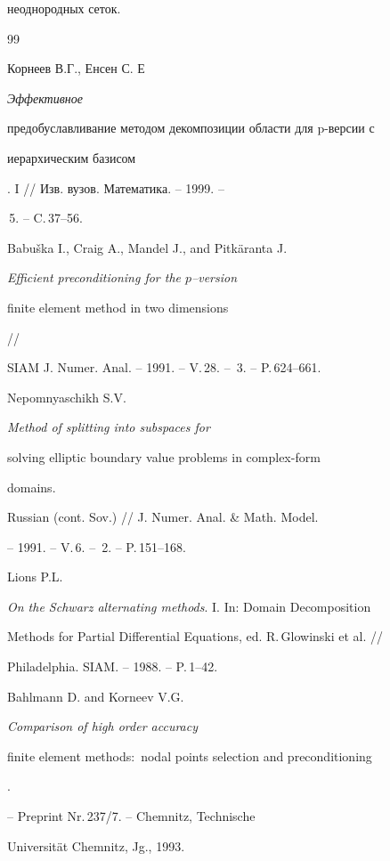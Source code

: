неоднородных сеток. 





\begin{thebibliography}{99} 







Корнеев В.Г., Енсен С. Е {\em Эффективное 


предобуславливание методом декомпозиции области для p-версии с 


иерархическим базисом}. I // Изв. вузов. Математика. -- 1999. --


\No\,5. -- C.\,37--56.




Babu\v{s}ka I., Craig A., Mandel J., and  Pitk\"{a}ranta J.


{\em Efficient preconditioning for the $p$--version 


finite element method in two dimensions} //


SIAM J. Numer. Anal. -- 1991. -- V.\,28. -- \No\,3. -- P.\,624--661.




Nepomnyaschikh S.V. {\em Method of splitting into subspaces for


solving elliptic boundary value problems in complex-form


domains.}


Russian (cont. Sov.) // J. Numer. Anal. \& Math. Model.


-- 1991. -- V.\,6. -- \No\,2. -- P.\,151--168.




Lions P.L.


{\em On the Schwarz alternating methods}. I. In: Domain Decomposition


Methods for Partial Differential Equations, ed. R.\,Glowinski et al. //


Philadelphia. SIAM. -- 1988. -- P.\,1--42.




Bahlmann D. and Korneev V.G.


{\em Comparison of high order accuracy


finite element methods$:$ nodal points selection and preconditioning}.


-- Preprint Nr.\,237/7. -- Chemnitz, Technische


Universit\"{a}t Chemnitz, Jg., 1993.



\end{thebibliography}
